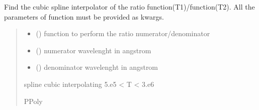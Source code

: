 \documentclass[letterpaper,10pt,english]{sphinxmanual}
\begin{document}
\begin{fulllineitems}
\label{\detokenize{doppler_dimming_lib:doppler_dimming_lib.codex.get_R_as_spline}}
\pysigstartsignatures
{}
\pysigstopsignatures
\sphinxAtStartPar
Find the cubic spline interpolator of the ratio function(T1)/function(T2). All the parameters of function must be provided as kwargs.
\begin{quote}\begin{description}
\begin{itemize}
\item {} 
\sphinxAtStartPar
{} () \textendash{} function to perform the ratio numerator/denominator

\item {} 
\sphinxAtStartPar
{} () \textendash{} numerator wavelenght in angstrom

\item {} 
\sphinxAtStartPar
{} () \textendash{} denominator wavelenght in angstrom

\end{itemize}

\sphinxAtStartPar
spline cubic interpolating 5.e5 \textless{} T \textless{} 3.e6

\sphinxAtStartPar
PPoly

\end{description}\end{quote}

\end{fulllineitems}

\end{document}
